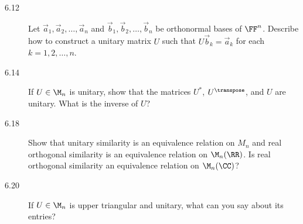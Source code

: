 \documentclass{homework}
\begin{document}
\begin{description}
  \begin{solution}

  \end{solution}

\item[6.12] Let \(\vec a_1, \vec a_2, \dots, \vec a_n\) and
  \(\vec b_1, \vec b_2, \dots, \vec b_n\) be orthonormal bases of
  \(\FF^n\).  Describe how to construct a unitary matrix \(U\) such
  that \(U \vec b_k = \vec a_k\) for each \(k = 1, 2, \dots, n\).

  \begin{solution}

  \end{solution}

\item[6.14] If \(U \in \M_n\) is unitary, show that the matrices
  \(U^*\), \(U^\transpose\), and \(U\) are unitary.  What is the
  inverse of \(U\)?

  \begin{solution}

  \end{solution}

\item[6.18] Show that unitary similarity is an equivalence relation on
  \(M_n\) and real orthogonal similarity is an equivalence relation on
  \(\M_n (\RR)\).  Is real orthogonal similarity an equivalence
  relation on \(\M_n (\CC)\)?

  \begin{solution}

  \end{solution}

\item[6.20] If \(U \in \M_n\) is upper triangular and unitary, what
  can you say about its entries?

  \begin{solution}

  \end{solution}
\end{description}
\end{document}
